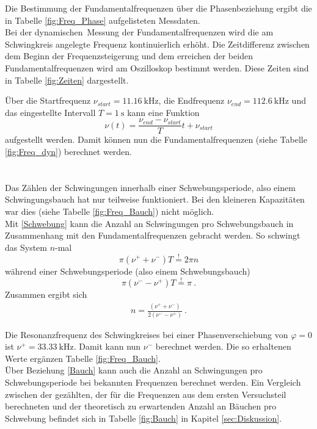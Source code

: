 Die Bestimmung der Fundamentalfrequenzen über die Phasenbeziehung ergibt die in Tabelle \ref{fig:Freq_Phase} aufgelisteten Messdaten.
 \\
Bei der \glqq dynamischen\grqq\ Messung der Fundamentalfrequenzen wird die am Schwingkreis angelegte Frequenz kontinuierlich erhöht. Die Zeitdifferenz zwischen dem Beginn der Frequenzsteigerung und dem erreichen der beiden Fundamentalfrequenzen wird am Oszilloskop bestimmt werden. Diese Zeiten sind in Tabelle \ref{fig:Zeiten} dargestellt.

Über die Startfrequenz $\nu_{start} = \SI{11.16}{\kilo\hertz}$, die Endfrequenz $\nu_{end} = \SI{112.6}{\kilo\hertz}$ und das eingestellte Intervall $T = \SI{1}{\second}$ kann eine Funktion
\[ \nu(t) = \frac{\nu_{end}-\nu_{start}}{T}t+\nu_{start} \]
aufgestellt werden. Damit können nun die Fundamentalfrequenzen (siehe Tabelle \ref{fig:Freq_dyn}) berechnet werden. \\

\ \\
\ \\
Das Zählen der Schwingungen innerhalb einer Schwebungsperiode, also einem Schwingungsbauch hat nur teilweise funktioniert. Bei den kleineren Kapazitäten war dies (siehe Tabelle \ref{fig:Freq_Bauch}) nicht möglich. \\
Mit \eqref{Schwebung} kann die Anzahl an Schwingungen pro Schwebungsbauch in Zusammenhang mit den Fundamentalfrequenzen gebracht werden. So schwingt das System $n$-mal
\[ \pi(\nu^+ + \nu^-)T \overset{!}{=} 2\pi n \]
während einer Schwebungsperiode (also einem Schwebungsbauch)
\[ \pi(\nu^- - \nu^+)T \overset{!}{=} \pi \ . \]
Zusammen ergibt sich
\begin{align}\label{Bauch}
	n = \frac{(\nu^+ + \nu^-)}{2(\nu^- - \nu^+)} \ .
\end{align}

Die Resonanzfrequenz des Schwingkreises bei einer Phasenverschiebung von $\varphi=0$ ist $\nu^+=\SI{33.33}{\kilo\hertz}$. Damit kann nun $\nu^-$ berechnet werden. Die so erhaltenen Werte ergänzen Tabelle \ref{fig:Freq_Bauch}.
 \\
Über Beziehung \eqref{Bauch} kann auch die Anzahl an Schwingungen pro Schwebungsperiode bei bekannten Frequenzen berechnet werden. Ein Vergleich zwischen der gezählten, der für die Frequenzen aus dem ersten Versuchsteil berechneten und der theoretisch zu erwartenden Anzahl an Bäuchen pro Schwebung befindet sich in Tabelle \ref{fig:Bauch} in Kapitel \ref{sec:Diskussion}.
